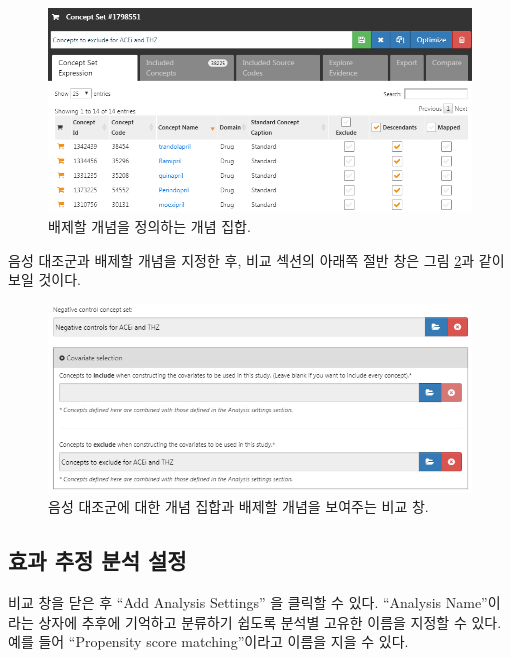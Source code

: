 \documentclass[11pt]{book}
\theoremstyle{definition}
\theoremstyle{definition}
\theoremstyle{definition}
\theoremstyle{remark}
\begin{document}
\begin{figure}

{\centering \includegraphics[width=1\linewidth]{images/PopulationLevelEstimation/covsToExclude} 

}

\caption{배제할 개념을 정의하는 개념 집합.}\label{fig:covsToExclude}
\end{figure}

음성 대조군과 배제할 개념을 지정한 후, 비교 섹션의 아래쪽 절반 창은 그림
\ref{fig:comparisons2}과 같이 보일 것이다.

\begin{figure}

{\centering \includegraphics[width=1\linewidth]{images/PopulationLevelEstimation/comparisons2} 

}

\caption{음성 대조군에 대한 개념 집합과 배제할 개념을 보여주는 비교 창.}\label{fig:comparisons2}
\end{figure}

\subsection{효과 추정 분석 설정}\label{---}

비교 창을 닫은 후 ``Add Analysis Settings'' 을 클릭할 수 있다.
``Analysis Name''이라는 상자에 추후에 기억하고 분류하기 쉽도록 분석별
고유한 이름을 지정할 수 있다. 예를 들어 ``Propensity score
matching''이라고 이름을 지을 수 있다.
\end{document}

